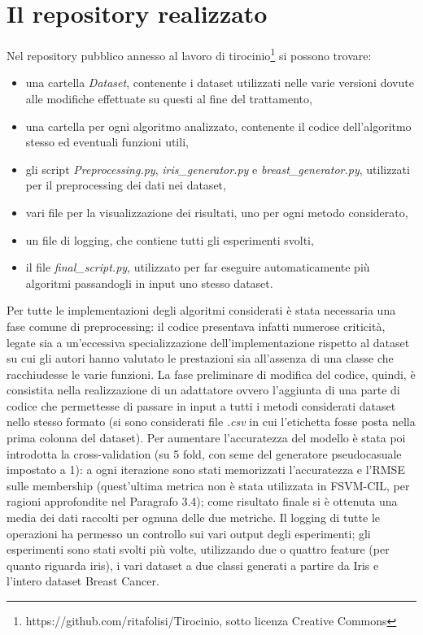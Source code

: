 \documentclass[oneside, openany]{book}
\begin{document}
	\section{Il repository realizzato}
	Nel repository pubblico annesso al lavoro di tirocinio\footnote{https://github.com/ritafolisi/Tirocinio, sotto licenza Creative Commons} si possono trovare:
	\begin{itemize}
		\item una cartella \textit{Dataset}, contenente i dataset utilizzati nelle varie versioni dovute alle modifiche effettuate su questi al fine del trattamento,
		\item una cartella per ogni algoritmo analizzato, contenente il codice dell'algoritmo stesso ed eventuali funzioni utili,
		\item gli script \textit{Preprocessing.py}, \textit{iris\_generator.py} e \textit{breast\_generator.py}, utilizzati per il preprocessing dei dati nei dataset,
		\item vari file per la visualizzazione dei risultati, uno per ogni metodo considerato,
		\item un file di logging, che contiene tutti gli esperimenti svolti,
		\item il file \textit{final\_script.py}, utilizzato per far eseguire automaticamente più algoritmi passandogli in input uno stesso dataset. 
	\end{itemize}
	
	Per tutte le implementazioni degli algoritmi considerati è stata necessaria una fase comune di preprocessing: il codice presentava infatti numerose criticità, legate sia a un'eccessiva specializzazione dell'implementazione rispetto al dataset su cui gli autori hanno valutato le prestazioni sia all'assenza di una classe che racchiudesse le varie funzioni.
	La fase preliminare di modifica del codice, quindi, è consistita nella realizzazione di un adattatore ovvero l'aggiunta di una parte di codice che permettesse di passare in input a tutti i metodi considerati dataset nello stesso formato (si sono considerati file \textit{.csv} in cui l'etichetta fosse posta nella prima colonna del dataset). 
	Per aumentare l'accuratezza del modello è stata poi introdotta la cross-validation (su 5 fold, con seme del generatore pseudocasuale impostato a 1): a ogni iterazione sono stati memorizzati l'accuratezza e l'RMSE sulle membership (quest'ultima metrica non è stata utilizzata in FSVM-CIL, per ragioni approfondite nel Paragrafo 3.4); come risultato finale si è ottenuta una media dei dati raccolti per ognuna delle due metriche.
	Il logging di tutte le operazioni ha permesso un controllo sui vari output degli esperimenti; gli esperimenti sono stati svolti più volte, utilizzando due o quattro feature (per quanto riguarda iris), i vari dataset a due classi generati a partire da Iris e l'intero dataset Breast Cancer.
	
\end{document}
